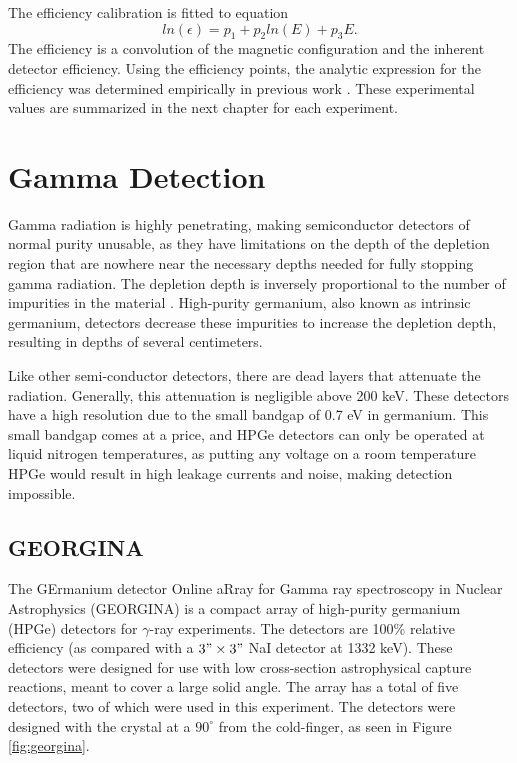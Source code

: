 

The efficiency calibration is fitted to equation
\begin{equation}
    ln(\epsilon) = p_1+p_2ln(E)+p_3E.
    \label{eq:SiLi_Eff}
\end{equation}
The efficiency is a convolution of the magnetic configuration and the inherent detector efficiency. Using the efficiency points, the analytic expression for the efficiency was determined empirically in previous work \citep{battaglia15:_iceball_176lu}. These experimental values are summarized in the next chapter for each experiment.

\section{Gamma Detection}

Gamma radiation is highly penetrating, making semiconductor detectors of normal purity unusable, as they have limitations on the depth of the depletion region that are nowhere near the necessary depths needed for fully stopping gamma radiation. The depletion depth is inversely proportional to the number of impurities in the material \citep{knoll00:rad_det_meas}. High-purity germanium, also known as intrinsic germanium, detectors decrease these impurities to increase the depletion depth, resulting in depths of several centimeters.

Like other semi-conductor detectors, there are dead layers that attenuate the radiation. Generally, this attenuation is negligible above 200 keV. These detectors have a high resolution due to the small bandgap of 0.7 eV in germanium. This small bandgap comes at a price, and HPGe detectors can only be operated at liquid nitrogen temperatures, as putting any voltage on a room temperature HPGe would result in high leakage currents and noise, making detection impossible.

\subsection{GEORGINA}

The GErmanium detector Online aRray for Gamma ray spectroscopy in Nuclear Astrophysics (GEORGINA) is a compact array of high-purity germanium (HPGe) detectors for $\gamma$-ray experiments\citep{isnap18:_georgina}. The detectors are 100\% relative efficiency (as compared with a $3"\times3"$ NaI detector at 1332 keV). These detectors were designed for use with low cross-section astrophysical capture reactions, meant to cover a large solid angle. The array has a total of five detectors, two of which were used in this experiment. The detectors were designed with the crystal at a $90^{\circ}$ from the cold-finger, as seen in Figure \ref{fig:georgina}.

